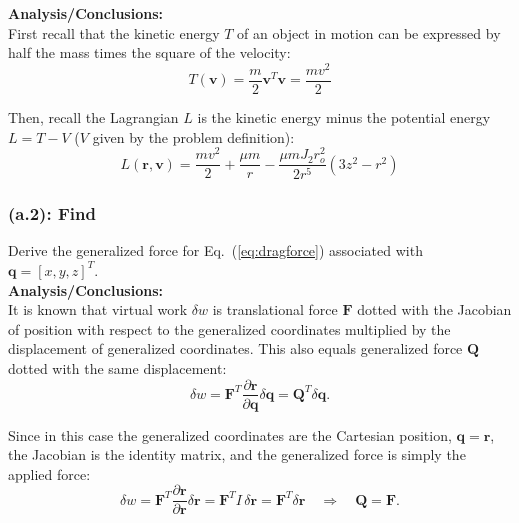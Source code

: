 \documentclass[titlepage]{article}
\begin{document}
\textbf{Analysis/Conclusions:}\\

First recall that the kinetic energy $T$ of an object in motion can be expressed by half the mass times the square of the velocity:
\begin{equation}
	T(\boldsymbol{v})=\frac{m}{2}\boldsymbol{v}^T\boldsymbol{v}=\frac{mv^2}{2}
\end{equation}
\begin{mdframed}[linewidth=1pt, innertopmargin=10pt, innerbottommargin=10pt]
	Then, recall the Lagrangian $L$ is the kinetic energy minus the potential energy $L=T-V$ ($V$ given by the problem definition):
	\begin{equation}
		L(\boldsymbol{r},\boldsymbol{v})=\frac{mv^2}{2}+\frac{\mu m}{r}-\frac{\mu mJ_2r_o^2}{2r^5}\left(3z^2-r^2\right)
	\end{equation}
\end{mdframed}

\subsubsection*{(a.2): Find}

Derive the generalized force for Eq.~(\ref{eq:dragforce}) associated with $\boldsymbol{q}=[x,y,z]^T$.\\

\textbf{Analysis/Conclusions:}\\

It is known that virtual work $\delta w$ is translational force $\boldsymbol{F}$ dotted with the Jacobian of position with respect to the generalized coordinates multiplied by the displacement of generalized coordinates. This also equals generalized force $\boldsymbol{Q}$ dotted with the same displacement:
\begin{equation}
	\delta w=\boldsymbol{F}^T\frac{\partial \boldsymbol{r}}{\partial \boldsymbol{q}}\delta\boldsymbol{q}=\boldsymbol{Q}^T\delta\boldsymbol{q}.
\end{equation}

Since in this case the generalized coordinates are the Cartesian position, $\boldsymbol{q}=\boldsymbol{r}$, the Jacobian is the identity matrix, and the generalized force is simply the applied force:
\begin{equation}
	\delta w = \boldsymbol{F}^T\frac{\partial\boldsymbol{r}}{\partial\boldsymbol{r}}\delta\boldsymbol{r}=\boldsymbol{F}^T I\,\delta\boldsymbol{r}=\boldsymbol{F}^T\delta\boldsymbol{r}\quad\Rightarrow\quad\boldsymbol{Q}=\boldsymbol{F}.
\end{equation}
\end{document}
